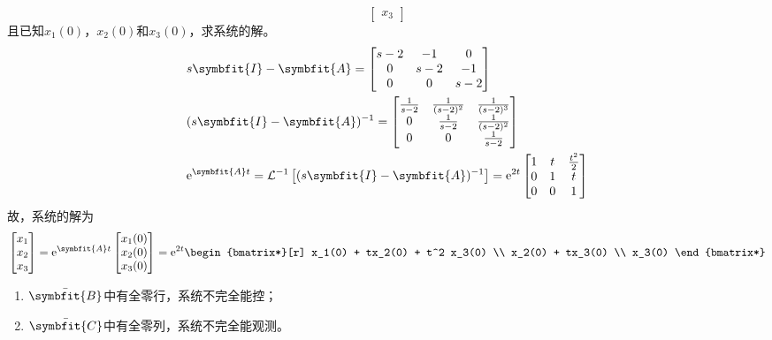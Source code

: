 \begin{exercise}
\begin{enumerate}
\begin{equation*}
\begin{bmatrix}
                x_3
            \end{bmatrix}
        \end{equation*}
        且已知$x_1(0)$，$x_2(0)$和$x_3(0)$，求系统的解。
        \begin{align*}
            &s\symbfit{I} - \symbfit{A} = \begin{bmatrix}
                s-2 & -1 & 0 \\
                0 & s-2 & -1 \\
                0 & 0 & s-2
            \end{bmatrix} \\
            &(s\symbfit{I} - \symbfit{A})^{-1} = \begin{bmatrix}
                \frac{1}{s-2} & \frac{1}{(s-2)^2} & \frac{1}{(s-2)^3} \\
                0 & \frac{1}{s-2} & \frac{1}{(s-2)^2} \\
                0 & 0 & \frac{1}{s-2}
            \end{bmatrix} \\
            &{\rm e}^{\symbfit{A}t} = \mathcal{L}^{-1}\left[(s\symbfit{I} - \symbfit{A})^{-1}\right] = {\rm e}^{2t} \begin{bmatrix}
                1 & t & \frac{t^2}{2} \\
                0 & 1 & t \\
                0 & 0 & 1
            \end{bmatrix}
        \end{align*}
        故，系统的解为
        \begin{equation*}
            \begin{bmatrix}
                x_1 \\
                x_2 \\
                x_3
            \end{bmatrix} = {\rm e}^{\symbfit{A}t} \begin{bmatrix}
                x_1(0) \\
                x_2(0) \\
                x_3(0)
            \end{bmatrix} = {\rm e}^{2t} \begin{bmatrix*}[r]
                x_1(0) + tx_2(0) + t^2 x_3(0) \\
                x_2(0) + tx_3(0) \\
                x_3(0)
            \end{bmatrix*}
        \end{equation*}
    \end{enumerate}
\end{exercise}

\begin{exercise} %
    \begin{enumerate}
        \item $\bar{\symbfit{B}}$中有全零行，系统不完全能控；
        \item $\bar{\symbfit{C}}$中有全零列，系统不完全能观测。
    \end{enumerate}
\end{exercise}
